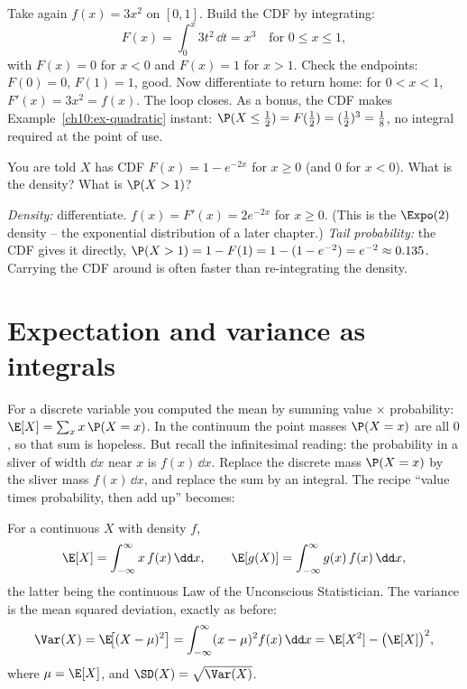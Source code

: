 \begin{example}
\label{ch10:ex-roundtrip}
Take again $f(x) = 3x^2$ on $[0,1]$. Build the CDF by integrating:
\[
  F(x) = \int_0^x 3t^2 \,\dd t = x^3 \quad \text{for } 0 \le x \le 1,
\]
with $F(x)=0$ for $x<0$ and $F(x)=1$ for $x>1$. Check the endpoints: $F(0)=0$,
$F(1)=1$, good. Now differentiate to return home: for $0<x<1$,
$F'(x) = 3x^2 = f(x)$. The loop closes. As a bonus, the CDF makes
Example~\ref{ch10:ex-quadratic} instant: $\P(X\le \tfrac12) = F(\tfrac12)
= (\tfrac12)^3 = \tfrac18$, no integral required at the point of use.
\end{example}

\begin{walkbox}
You are told $X$ has CDF $F(x) = 1 - e^{-2x}$ for $x \ge 0$ (and $0$ for $x<0$).
What is the density? What is $\P(X > 1)$?

\emph{Density:} differentiate. $f(x) = F'(x) = 2e^{-2x}$ for $x \ge 0$. (This is the
$\Expo(2)$ density -- the exponential distribution of a later chapter.) \emph{Tail
probability:} the CDF gives it directly, $\P(X>1) = 1 - F(1) = 1 - (1 - e^{-2})
= e^{-2} \approx 0.135$. Carrying the CDF around is often faster than re-integrating
the density.
\end{walkbox}

\section{Expectation and variance as integrals}
\label{ch10:expectation}

For a discrete variable you computed the mean by summing value $\times$
probability:
$\E[X] = \sum_x x\,\P(X=x)$. In the continuum the point masses $\P(X=x)$ are all
$0$, so that sum is hopeless. But recall the infinitesimal reading: the probability
in a sliver of width $\dd x$ near $x$ is $f(x)\,\dd x$. Replace the discrete mass
$\P(X=x)$ by the sliver mass $f(x)\,\dd x$, and replace the sum by an integral. The
recipe ``value times probability, then add up'' becomes:

\begin{definition}
\label{ch10:def-EV}
For a continuous $X$ with density $f$,
\[
  \E[X] = \int_{-\infty}^{\infty} x\,f(x)\,\dd x,
  \qquad
  \E[g(X)] = \int_{-\infty}^{\infty} g(x)\,f(x)\,\dd x,
\]
the latter being the continuous Law of the Unconscious Statistician. The variance
is the mean squared deviation, exactly as before:
\[
  \Var(X) = \E\!\big[(X-\mu)^2\big] = \int_{-\infty}^{\infty} (x-\mu)^2 f(x)\,\dd x
          = \E[X^2] - \big(\E[X]\big)^2,
\]
where $\mu = \E[X]$, and $\SD(X) = \sqrt{\Var(X)}$.
\end{definition}

